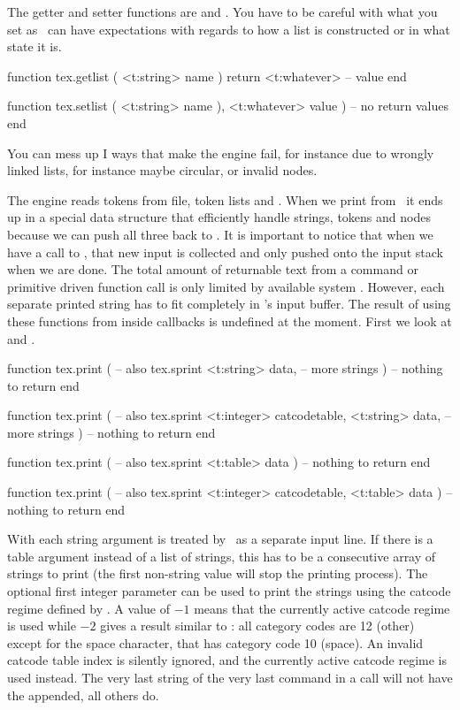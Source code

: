 The getter and setter functions are  and . You have
to be careful with what you set as \TEX\ can have expectations with regards to
how a list is constructed or in what state it is.

\starttyping[option=LUA]
function tex.getlist ( <t:string> name )
    return <t:whatever> -- value
end

function tex.setlist ( <t:string> name ), <t:whatever> value )
    -- no return values
end
\stoptyping

You can mess up I ways that make the engine fail, for instance due to wrongly
linked lists, for instance maybe circular, or invalid nodes.

\stopsubsection

\startsubsection[title=Printing]

The engine reads tokens from file, token lists and \LUA. When we print from \LUA\
it ends up in a special data structure that efficiently handle strings, tokens
and nodes because we can push all three back to \TEX. It is important to notice
that when we have a call to \LUA, that new input is collected and only pushed
onto the input stack when we are done. The total amount of returnable text from a
\type {\directlua} command or primitive driven function call is only limited by
available system \RAM. However, each separate printed string has to fit
completely in \TEX's input buffer. The result of using these functions from
inside callbacks is undefined at the moment. First we look at 
and \type {tex.sprint}.

\starttyping[option=LUA]
function tex.print ( -- also tex.sprint
    <t:string> data,
    -- more strings
)
    -- nothing to return
end

function tex.print ( -- also tex.sprint
    <t:integer> catcodetable,
    <t:string>  data,
    -- more strings
)
    -- nothing to return
end

function tex.print ( -- also tex.sprint
    <t:table> data
)
    -- nothing to return
end

function tex.print ( -- also tex.sprint
    <t:integer> catcodetable,
    <t:table>   data
)
    -- nothing to return
end
\stoptyping

With  each string argument is treated by \TEX\ as a separate
input line. If there is a table argument instead of a list of strings, this has
to be a consecutive array of strings to print (the first non-string value will
stop the printing process). The optional first integer parameter can be used to
print the strings using the catcode regime defined by \type {\catcodetable}. A
value of $-1$ means that the currently active catcode regime is used while $-2$
gives a result similar to \type {\the\toks}: all category codes are 12 (other)
except for the space character, that has category code 10 (space). An invalid
catcode table index is silently ignored, and the currently active catcode regime
is used instead. The very last string of the very last \type {tex.print} command
in a \type {\directlua} call will not have the \type {\endlinechar} appended, all
others do.

